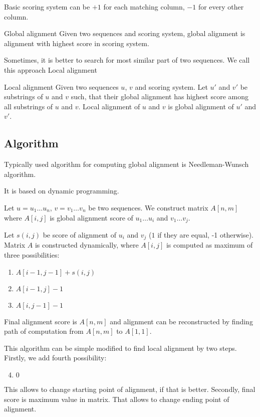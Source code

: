 Basic scoring system can be $+1$ for each matching column, $-1$ for every other column.

\begin{definition}{Global alignment}
Given two sequences and scoring system, global alignment is alignment with highest score in scoring system.
\end{definition}

Sometimes, it is better to search for most similar part of two sequences. We call this approach Local alignment

\begin{definition}{Local alignment}
Given two sequences $u$, $v$ and scoring system. Let $u'$ and $v'$ be substrings of $u$ and $v$ such, that their global alignment has highest score among all substrings of $u$ and $v$. Local alignment of $u$ and $v$ is global alignment of $u'$ and $v'$.
\end{definition}

\subsection{Algorithm}
Typically used algorithm for computing global alignment is Needleman-Wunsch algorithm.

It is based on dynamic programming. 

Let $u=u_1 \dots u_n$, $v=v_1 \dots v_n$ be two sequences. We construct matrix $A[n,m]$ where $A[i,j]$ is global alignment score of $u_1 \dots u_i$ and $v_1 \dots v_j$.

Let $s(i,j)$ be score of alignment of $u_i$ and $v_j$ ($1$ if they are equal, -1 otherwise).
Matrix $A$ is constructed dynamically, where $A[i,j]$ is computed as maximum of three possibilities:
\begin{enumerate}
\item $A[i-1,j-1]+s(i,j)$
\item $A[i-1,j]-1$
\item $A[i,j-1]-1$
\end{enumerate}

Final alignment score is $A[n,m]$ and alignment can be reconstructed by finding path of computation from $A[n,m]$ to $A[1,1]$.

This algorithm can be simple modified to find local alignment by two steps.
Firstly, we add fourth possibility:
\begin{enumerate}
 \setcounter{enumi}{3}
\item $0$
\end{enumerate}
This allows to change starting point of alignment, if that is better.
Secondly, final score is maximum value in matrix. That allows to change ending point of alignment.

